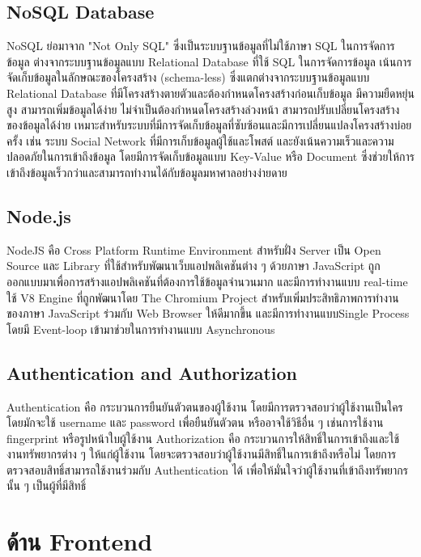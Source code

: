 \subsection{NoSQL Database}
NoSQL ย่อมาจาก "Not Only SQL" ซึ่งเป็นระบบฐานข้อมูลที่ไม่ใช้ภาษา SQL ในการจัดการข้อมูล ต่างจากระบบฐานข้อมูลแบบ Relational Database ที่ใช้ SQL ในการจัดการข้อมูล
เน้นการจัดเก็บข้อมูลในลักษณะของโครงสร้าง (schema-less) ซึ่งแตกต่างจากระบบฐานข้อมูลแบบ Relational Database ที่มีโครงสร้างตายตัวและต้องกำหนดโครงสร้างก่อนเก็บข้อมูล
มีความยืดหยุ่นสูง สามารถเพิ่มข้อมูลได้ง่าย ไม่จำเป็นต้องกำหนดโครงสร้างล่วงหน้า สามารถปรับเปลี่ยนโครงสร้างของข้อมูลได้ง่าย เหมาะสำหรับระบบที่มีการจัดเก็บข้อมูลที่ซับซ้อนและมีการเปลี่ยนแปลงโครงสร้างบ่อยครั้ง เช่น ระบบ Social Network ที่มีการเก็บข้อมูลผู้ใช้และโพสต์
และยังเน้นความเร็วและความปลอดภัยในการเข้าถึงข้อมูล โดยมีการจัดเก็บข้อมูลแบบ Key-Value หรือ Document ซึ่งช่วยให้การเข้าถึงข้อมูลเร็วกว่าและสามารถทำงานได้กับข้อมูลมหาศาลอย่างง่ายดาย\cite{NoSQL}

\subsection{Node.js}
NodeJS คือ Cross Platform Runtime Environment สำหรับฝั่ง Server เป็น Open Source และ Library 
ที่ใช้สำหรับพัฒนาเว็บแอปพลิเคชันต่าง ๆ ด้วยภาษา JavaScript  ถูกออกแบบมาเพื่อการสร้างแอปพลิเคชันที่ต้องการใช้ข้อมูลจำนวนมาก 
และมีการทำงานแบบ real-time ใช้ V8 Engine ที่ถูกพัฒนาโดย The Chromium Project สำหรับเพิ่มประสิทธิภาพการทำงานของภาษา JavaScript 
ร่วมกับ Web Browser ให้ดีมากขึ้น และมีการทำงานแบบSingle Process โดยมี Event-loop เข้ามาช่วยในการทำงานแบบ Asynchronous\cite{Node.js}

\subsection{Authentication and Authorization}
Authentication คือ กระบวนการยืนยันตัวตนของผู้ใช้งาน โดยมีการตรวจสอบว่าผู้ใช้งานเป็นใคร โดยมักจะใช้ username และ password เพื่อยืนยันตัวตน หรืออาจใช้วิธีอื่น ๆ เช่นการใช้งาน fingerprint หรือรูปหน้าใบผู้ใช้งาน
\enskip
Authorization คือ กระบวนการให้สิทธิ์ในการเข้าถึงและใช้งานทรัพยากรต่าง ๆ ให้แก่ผู้ใช้งาน โดยจะตรวจสอบว่าผู้ใช้งานมีสิทธิ์ในการเข้าถึงหรือไม่ โดยการตรวจสอบสิทธิ์สามารถใช้งานร่วมกับ Authentication ได้ เพื่อให้มั่นใจว่าผู้ใช้งานที่เข้าถึงทรัพยากรนั้น ๆ เป็นผู้ที่มีสิทธิ์\cite{Auth}

\section{ด้าน Frontend}

